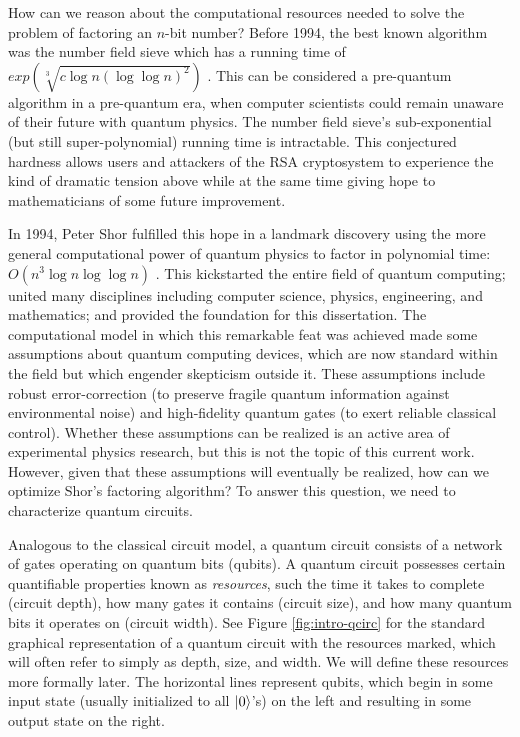 How can we reason about the computational resources needed to solve the
problem of factoring an $n$-bit number?
Before 1994, the best known algorithm was the
number field sieve which has a running time of
$exp(\sqrt[3]{c \log n (\log \log n)^2})$ \cite{Lenstra1993}.
This can be considered a pre-quantum
algorithm in a pre-quantum era, when computer scientists could remain
unaware of their future with quantum physics.
The number field sieve's sub-exponential (but still super-polynomial)
running time is intractable.
This conjectured hardness allows users and attackers of the RSA cryptosystem
to experience the kind of dramatic tension above while at the same time
giving hope to mathematicians of some future improvement.

In 1994, Peter Shor fulfilled this hope in a landmark
discovery using the more general computational power of quantum physics
to factor in polynomial time: $O(n^3\log n \log\log n)$ \cite{Shor1994}. 
This kickstarted the entire field of quantum computing; united many
disciplines including computer science, physics, engineering, and
mathematics; and provided the foundation for this dissertation.
The computational model in which this remarkable feat was achieved
made some assumptions about quantum computing devices, which are now
standard within the field but which engender skepticism outside it.
These assumptions include robust error-correction (to preserve fragile
quantum information against environmental noise) and high-fidelity
quantum gates (to exert reliable classical control).
Whether these assumptions can be
realized is an active area of experimental physics research, but this is not the
topic of this current work. However, given that these assumptions will
eventually be realized, how can we optimize Shor's factoring algorithm?
To answer this question, we need to characterize quantum circuits.

Analogous to the classical circuit model, a quantum circuit consists of
a network of gates operating on quantum bits (qubits). A quantum
circuit possesses certain quantifiable properties known as \emph{resources},
such the time it takes to complete (circuit depth), how many gates
it contains (circuit size), and how many quantum bits it operates on
(circuit width).
See Figure \ref{fig:intro-qcirc} for the standard graphical representation of
a quantum circuit with the resources marked, which will often refer to
simply as depth, size, and width.
We will define these resources more formally later.
The horizontal
lines represent qubits, which begin in some input state
(usually initialized to all $\left\vert{0}\right\rangle$'s) on the left and resulting in some
output state on the right.

